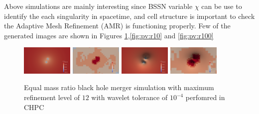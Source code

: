 Above simulations are mainly interesting since BSSN variable $\chi$ can be use to identify the each singularity in spacetime, and cell structure is important to check the Adaptive Mesh Refinement (AMR) is functioning properly. Few of the generated
images are shown in Figures \ref{fig:pv:r1},\ref{fig:pv:r10} and \ref{fig:pv:r100} 

\newpage

\begin{figure}[H]
    \centering
    \includegraphics[width=0.22\textwidth]{figs/paraview/r1/img_slice_000200.png}
    \includegraphics[width=0.22\textwidth]{figs/paraview/r1/img_slice_level_000200.png}
    \includegraphics[width=0.22\textwidth]{figs/paraview/r1/img_slice_wbs_000200.png}
    \includegraphics[width=0.22\textwidth]{figs/paraview/r1/img_slice_level_wbs_000200.png}
    \caption{Equal mass ratio black hole merger simulation with maximum refinement level of $12$ with wavelet tolerance of $10^{-4}$ perfomred in CHPC \label{fig:pv:r1}}
\end{figure}


